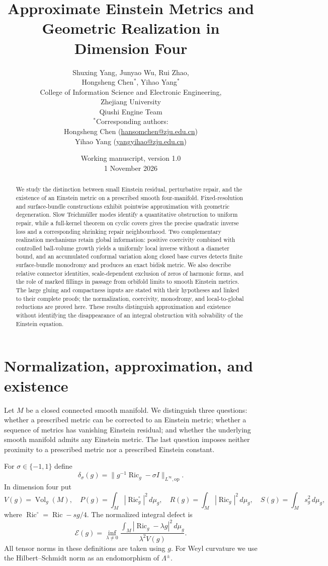\documentclass[11pt,a4paper]{article}
\title{Approximate Einstein Metrics and Geometric Realization in Dimension Four}
\author{\normalsize Shuxing Yang, Junyao Wu, Rui Zhao,\\[3pt]
\normalsize Hongsheng Chen$^{*}$, Yihao Yang$^{*}$\\[9pt]
\small College of Information Science and Electronic Engineering,\\
\small Zhejiang University\\
\small Qiushi Engine Team\\[8pt]
\footnotesize $^{*}$Corresponding authors:\\
\footnotesize Hongsheng Chen (\href{mailto:hansomchen@zju.edu.cn}{hansomchen@zju.edu.cn})\\
\footnotesize Yihao Yang (\href{mailto:yangyihao@zju.edu.cn}{yangyihao@zju.edu.cn})}
\date{\small Working manuscript, version 1.0\\1 November 2026}
\theoremstyle{definition}\newtheorem{definition}[theorem]{Definition}
\theoremstyle{remark}\newtheorem{remark}[theorem]{Remark}
\DeclareMathOperator{\Ric}{Ric}
\DeclareMathOperator{\Vol}{Vol}
\newcommand{\op}{\mathrm{op}}
\newcommand{\dd}{\,d\mu_g}
\newcommand{\Riczero}{\Ric^{\circ}}
\newcommand{\Ecal}{\mathcal E}
\begin{document}
\maketitle

\begin{abstract}
We study the distinction between small Einstein residual, perturbative repair, and the existence of an Einstein metric on a prescribed smooth four-manifold. Fixed-resolution and surface-bundle constructions exhibit pointwise approximation with geometric degeneration. Slow Teichm\"uller modes identify a quantitative obstruction to uniform repair, while a full-kernel theorem on cyclic covers gives the precise quadratic inverse loss and a corresponding shrinking repair neighbourhood. Two complementary realization mechanisms retain global information: positive coercivity combined with controlled ball-volume growth yields a uniformly local inverse without a diameter bound, and an accumulated conformal variation along closed base curves detects finite surface-bundle monodromy and produces an exact bidisk metric. We also describe relative connector identities, scale-dependent exclusion of zeros of harmonic forms, and the role of marked fillings in passage from orbifold limits to smooth Einstein metrics. The large gluing and compactness inputs are stated with their hypotheses and linked to their complete proofs; the normalization, coercivity, monodromy, and local-to-global reductions are proved here. These results distinguish approximation and existence without identifying the disappearance of an integral obstruction with solvability of the Einstein equation.
\end{abstract}
\tableofcontents

\section{Normalization, approximation, and existence}
Let $M$ be a closed connected smooth manifold. We distinguish three questions: whether a prescribed metric can be corrected to an Einstein metric; whether a sequence of metrics has vanishing Einstein residual; and whether the underlying smooth manifold admits any Einstein metric. The last question imposes neither proximity to a prescribed metric nor a prescribed Einstein constant.

For $\sigma\in\{-1,1\}$ define
\begin{equation}\label{eq:delta}
 \delta_\sigma(g)=\|g^{-1}\Ric_g-\sigma I\|_{L^\infty,\op}.
\end{equation}
In dimension four put
\begin{equation}\label{eq:energies}
 V(g)=\Vol_g(M),\quad P(g)=\int_M|\Riczero_g|^2\dd,
 \quad R(g)=\int_M|\Ric_g|^2\dd,
 \quad S(g)=\int_Ms_g^2\dd,
\end{equation}
where $\Riczero=\Ric-sg/4$. The normalized integral defect is
\begin{equation}\label{eq:integral-defect}
 \Ecal(g)=\inf_{\lambda\ne0}
 \frac{\int_M|\Ric_g-\lambda g|^2\dd}{\lambda^2 V(g)}.
\end{equation}
All tensor norms in these definitions are taken using $g$. For Weyl curvature we use the Hilbert--Schmidt norm as an endomorphism of $\Lambda^\pm$.
\end{document}
